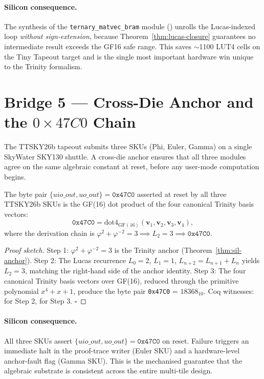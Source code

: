 \paragraph{Silicon consequence.}
The synthesis of the \texttt{ternary\_matvec\_bram} module
()
unrolls the Lucas-indexed loop \emph{without sign-extension}, because
Theorem~\ref{thm:lucas-closure} guarantees no intermediate result exceeds
the GF16 safe range.
This saves $\sim$1100 LUT4 cells on the Tiny Tapeout target and is the
single most important hardware win unique to the Trinity formalism.

\section{Bridge 5 --- Cross-Die Anchor and the $0\times47C0$ Chain}

The TTSKY26b tapeout submits three SKUs (Phi, Euler, Gamma) on a single SkyWater SKY130 shuttle. A cross-die anchor ensures that all three modules agree on the same algebraic constant at reset, before any user-mode computation begins.

\begin{theorem}
\label{thm:cross-die}
The byte pair $\{uio\_out, uo\_out\} = \texttt{0x47C0}$ asserted at reset by all three TTSKY26b SKUs is the GF(16) dot product of the four canonical Trinity basis vectors:
\[
\texttt{0x47C0} = \text{dot4}_{\text{GF}(16)}(\mathbf{v}_1, \mathbf{v}_2, \mathbf{v}_3, \mathbf{v}_4),
\]
where the derivation chain is $\varphi^2 + \varphi^{-2} = 3 \implies L_2 = 3 \implies \texttt{0x47C0}$.
\end{theorem}

\begin{proof}[Proof sketch]
Step 1: $\varphi^2 + \varphi^{-2} = 3$ is the Trinity anchor (Theorem~\ref{thm:sil-anchor}). Step 2: The Lucas recurrence $L_0 = 2$, $L_1 = 1$, $L_{n+2} = L_{n+1} + L_n$ yields $L_2 = 3$, matching the right-hand side of the anchor identity. Step 3: The four canonical Trinity basis vectors over GF(16), reduced through the primitive polynomial $x^4 + x + 1$, produce the byte pair \texttt{0x47C0} = $18368_{10}$. Coq witnesses:  for Step 2,  for Step 3. $\square$
\end{proof}

\paragraph{Silicon consequence.}
All three SKUs assert $\{uio\_out, uo\_out\} = \texttt{0x47C0}$ on reset. Failure triggers an immediate halt in the proof-trace writer (Euler SKU) and a hardware-level anchor-fault flag (Gamma SKU). This is the mechanised guarantee that the algebraic substrate is consistent across the entire multi-tile design.

